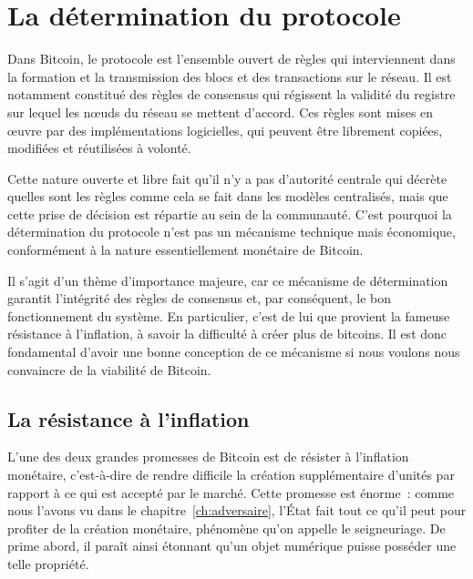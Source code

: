 
\chapter{La détermination du protocole}
\label{ch:determination}

Dans Bitcoin, le protocole est l'ensemble ouvert de règles qui interviennent dans la formation et la transmission des blocs et des transactions sur le réseau. Il est notamment constitué des règles de consensus qui régissent la validité du registre sur lequel les nœuds du réseau se mettent d'accord. Ces règles sont mises en œuvre par des implémentations logicielles, qui peuvent être librement copiées, modifiées et réutilisées à volonté.

Cette nature ouverte et libre fait qu'il n'y a pas d'autorité centrale qui décrète quelles sont les règles comme cela se fait dans les modèles centralisés, mais que cette prise de décision est répartie au sein de la communauté. C'est pourquoi la détermination du protocole n'est pas un mécanisme technique mais économique, conformément à la nature essentiellement monétaire de Bitcoin.

Il s'agit d'un thème d'importance majeure, car ce mécanisme de détermination garantit l'intégrité des règles de consensus et, par conséquent, le bon fonctionnement du système. En particulier, c'est de lui que provient la fameuse résistance à l'inflation, à savoir la difficulté à créer plus de bitcoins. Il est donc fondamental d'avoir une bonne conception de ce mécanisme si nous voulons nous convaincre de la viabilité de Bitcoin.

%

\section*{La résistance à l'inflation}

L'une des deux grandes promesses de Bitcoin est de résister à l'inflation monétaire, c'est-à-dire de rendre difficile la création supplémentaire d'unités par rapport à ce qui est accepté par le marché. Cette promesse est énorme~: comme nous l'avons vu dans le chapitre~\ref{ch:adversaire}, l'État fait tout ce qu'il peut pour profiter de la création monétaire, phénomène qu'on appelle le seigneuriage. De prime abord, il paraît ainsi étonnant qu'un objet numérique puisse posséder une telle propriété.

